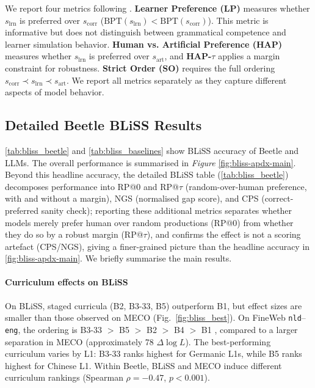 \documentclass[11pt]{article}
\newcommand{\beetle}{Beetle} %
\begin{document}
We report four metrics following \citep{gao2025bliss}. \textbf{Learner Preference (LP)} measures whether $s_{\mathrm{lrn}}$ is preferred over $s_{\mathrm{corr}}$ ($\mathrm{BPT}(s_{\mathrm{lrn}}) < \mathrm{BPT}(s_{\mathrm{corr}})$). This metric is informative but does not distinguish between grammatical competence and learner simulation behavior. \textbf{Human vs. Artificial Preference (HAP)} measures whether $s_{\mathrm{lrn}}$ is preferred over $s_{\mathrm{art}}$, and \textbf{HAP-$\tau$} applies a margin constraint for robustness. \textbf{Strict Order (SO)} requires the full ordering $s_{\mathrm{corr}} \prec s_{\mathrm{lrn}} \prec s_{\mathrm{art}}$. We report all metrics separately as they capture different aspects of model behavior.




\subsection{Detailed \beetle{} BLiSS Results}\label{bliss-detailed}

\autoref{tab:bliss_beetle} and \autoref{tab:bliss_baselines} show BLiSS accuracy of \beetle{} and LLMs. The overall performance is summarised in \textit{Figure} \ref{fig:bliss-apdx-main}. Beyond this headline accuracy, the detailed BLiSS table (\autoref{tab:bliss_beetle}) decomposes performance into RP@0 and RP@$\tau$ (random-over-human preference, with and without a margin), NGS (normalised gap score), and CPS (correct-preferred sanity check); reporting these additional metrics separates whether models merely prefer human over random productions (RP@0) from whether they do so by a robust margin (RP@$\tau$), and confirms the effect is not a scoring artefact (CPS/NGS), giving a finer-grained picture than the headline accuracy in \autoref{fig:bliss-apdx-main}. We briefly summarise the main results.

\paragraph{Curriculum effects on BLiSS}On BLiSS, staged curricula (B2, B3-33, B5) outperform B1, but effect sizes are smaller than those observed on MECO (Fig.~\ref{fig:bliss_best}). On FineWeb \texttt{nld}--\texttt{eng}, the ordering is B3-33 $>$ B5 $>$ B2 $>$ B4 $>$ B1 , compared to a larger separation in MECO (approximately 78 $\Delta \log L$). The best-performing curriculum varies by L1: B3-33 ranks highest for Germanic L1s, while B5 ranks highest for Chinese L1. Within \beetle{}, BLiSS and MECO induce different curriculum rankings (Spearman $\rho=-0.47$, $p<0.001$).
\end{document}
